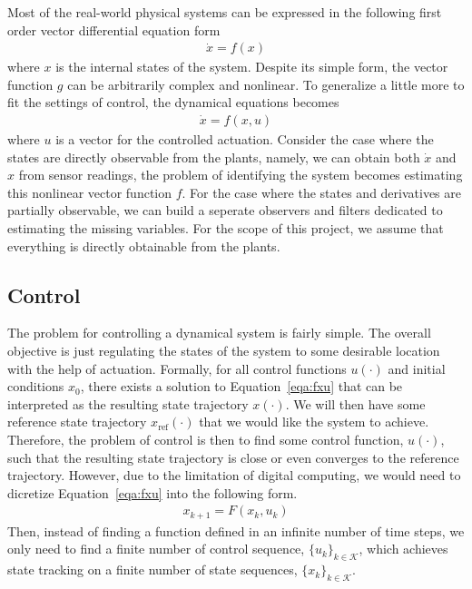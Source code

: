 \documentclass[10pt,twocolumn]{article}
\begin{document}
Most of the real-world physical systems can be expressed in the following first order
vector differential equation form
\begin{gather}\label{eqa:fx}
  \dot{x} = f(x)
\end{gather}
where $x$ is the internal states of the system. Despite its simple form, the vector
function $g$ can be arbitrarily complex and nonlinear. To generalize a little more
to fit the settings of control, the dynamical equations becomes
\begin{gather}\label{eqa:fxu}
  \dot{x} = f(x, u)
\end{gather}
where $u$ is a vector for the controlled actuation. Consider the case where the
states are directly observable from the plants, namely, we can obtain both $\dot{x}$
and $x$ from sensor readings, the problem of identifying the system becomes
estimating this nonlinear vector function $f$. For the case where the states
and derivatives are partially observable, we can build a seperate observers and filters dedicated
to estimating the missing variables. For the scope of this project, we assume that everything is
directly obtainable from the plants.

\subsection{Control}
The problem for controlling a dynamical system is fairly simple. The overall objective is
just regulating the states of the system to some desirable location with the help of actuation.
Formally, for all control functions $u(\cdot)$ and initial conditions $x_0$, there
exists a solution to Equation~\ref{eqa:fxu} that can be interpreted as the resulting
state trajectory $x(\cdot)$. We will then have some reference state trajectory
$x_{\mathrm{ref}}(\cdot)$ that we would like the system to achieve. Therefore, the
problem of control is then to find some control function, $u(\cdot)$, such that the
resulting state trajectory is close or even converges to the reference trajectory. However,
due to the limitation of digital computing, we would need to dicretize
Equation~\ref{eqa:fxu} into the following form.
\begin{gather}
  x_{k+1} = F(x_k, u_k)
\end{gather}
Then, instead of finding a function defined in an infinite number of time steps, we only need to
find a finite number of control sequence, $\{u_k\}_{k \in \mathcal{K}}$, which achieves
state tracking on a finite number of state sequences, $\{x_k\}_{k \in \mathcal{K}}$.
\end{document}
